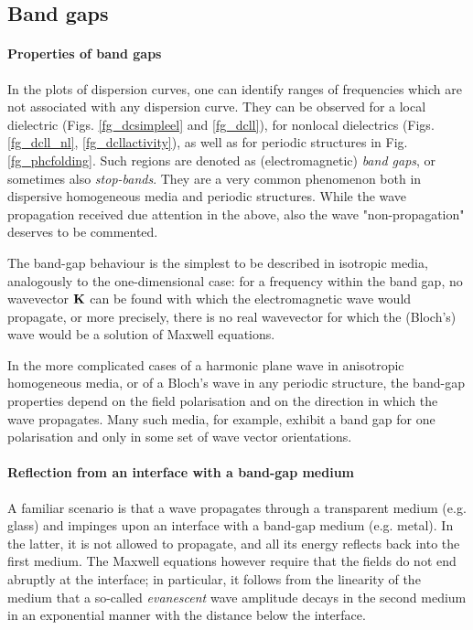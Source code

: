 \subsection{Band gaps} 
\paragraph{Properties of band gaps} %
In the plots of dispersion curves, one can identify ranges of frequencies which are not associated with any dispersion curve. 
They can be observed for a local dielectric (Figs. \ref{fg_dcsimpleel} and \ref{fg_dcll}), for nonlocal dielectrics (Figs. \ref{fg_dcll_nl}, \ref{fg_dcllactivity}), as well as for periodic structures in Fig. \ref{fg_phcfolding}. Such regions are denoted as (electromagnetic) \textit{band gaps}, or sometimes also \textit{stop-bands}. They are a very common phenomenon both in dispersive homogeneous media and periodic structures. 
While the wave propagation received due attention in the above, also the wave "non-propagation" deserves to be commented.

The band-gap behaviour is the simplest to be described in isotropic media, analogously to the one-dimensional case: for a frequency within the band gap, no wavevector ${\mathbf{K}}$ can be found with which the electromagnetic wave would propagate, or more precisely, there is no real wavevector for which the (Bloch's) wave would be a solution of Maxwell equations. 

In the more complicated cases of a harmonic plane wave in anisotropic homogeneous media, or of a Bloch's wave in any periodic structure, the band-gap properties depend on the field polarisation and on the direction in which the wave propagates. Many such media, for example, exhibit a band gap for one polarisation and only in some set of wave vector orientations.

\paragraph{Reflection from an interface with a band-gap medium} %
A familiar scenario is that a wave propagates through a transparent medium (e.g. glass) and impinges upon an interface with a band-gap medium (e.g. metal). In the latter, it is not allowed to propagate, and all its energy reflects back into the first medium. The Maxwell equations however require that the fields do not end abruptly at the interface; in particular, it follows from the linearity of the medium that a so-called \textit{evanescent} wave amplitude decays in the second medium in an exponential manner with the distance below the interface. %


